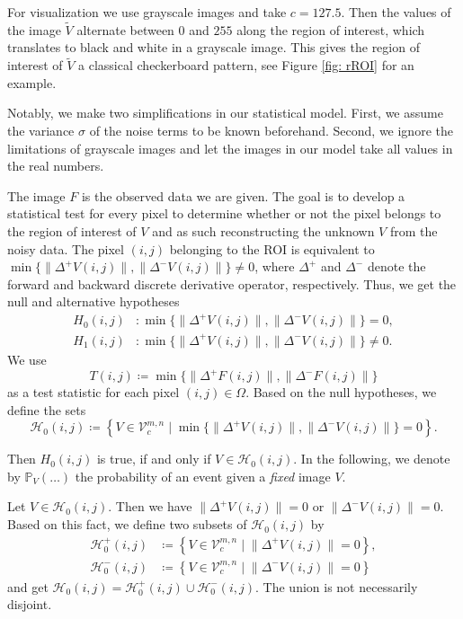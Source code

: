 \documentclass[a4paper,12pt]{article}
\newcommand{\norm}[1]{\lVert#1\rVert}
\theoremstyle{plain}
\theoremstyle{definition}
\begin{document}
For visualization we use grayscale images and take $c = 127.5$. Then the values of the image $\tilde{V}$ alternate between $0$ and $255$ along the region of interest, which translates to black and white in a grayscale image. This gives the region of interest of $\tilde{V}$ a classical checkerboard pattern, see Figure \ref{fig: rROI} for an example.

Notably, we make two simplifications in our statistical model. First, we assume the variance $\sigma$ of the noise terms to be known beforehand. Second, we ignore the limitations of grayscale images and let the images in our model take all values in the real numbers.

The image $F$ is the observed data we are given. The goal is to develop a statistical test for every pixel to determine whether or not the pixel belongs to the region of interest of $V$ and as such reconstructing the unknown $V$ from the noisy data. The pixel $(i, j)$ belonging to the ROI is equivalent to $\min \{ \norm{\Delta^+ V(i, j)}, \norm{\Delta^- V(i, j)} \} \neq 0$, where $\Delta^+$ and $\Delta^-$ denote the forward and backward discrete derivative operator, respectively. Thus, we get the null and alternative hypotheses
\begin{align*}
	H_0(i, j)&: \min \{ \norm{\Delta^+ V(i, j)}, \norm{\Delta^- V(i, j)} \} = 0, \\
	H_1(i, j)&: \min \{ \norm{\Delta^+ V(i, j)}, \norm{\Delta^- V(i, j)} \} \neq 0.
\end{align*}
We use
\begin{equation*}
	T(i, j) \coloneqq \min \{ \norm{\Delta^+ F(i, j)}, \norm{\Delta^- F(i, j)} \}
\end{equation*}
as a test statistic for each pixel $(i, j) \in \Omega$. Based on the null hypotheses, we define the sets
\begin{equation*}
	\mathcal{H}_0(i, j) \coloneqq \left\{ V \in \mathcal{V}_c^{m, n} \mid \min \{ \norm{\Delta^+ V(i, j)}, \norm{\Delta^- V(i, j)} \} = 0 \right\}.
\end{equation*}

Then $H_0(i, j)$ is true, if and only if $V \in \mathcal{H}_0(i, j)$. In the following, we denote by $\mathbb{P}_V( \ldots )$ the probability of an event given a \emph{fixed} image $V$.

Let $V \in \mathcal{H}_0(i, j)$. Then we have $\norm{\Delta^+ V(i, j)} = 0$ or $\norm{\Delta^- V(i, j)} = 0$. Based on this fact, we define two subsets of $\mathcal{H}_0(i, j)$ by
\begin{align*}
	\mathcal{H}_0^+(i, j) &\coloneqq \left\{ V \in \mathcal{V}_c^{m, n} \mid \norm{\Delta^+ V(i, j)} = 0 \right\}, \\
	\mathcal{H}_0^-(i, j) &\coloneqq \left\{ V \in \mathcal{V}_c^{m, n} \mid \norm{\Delta^- V(i, j)} = 0 \right\}
\end{align*}
and get $\mathcal{H}_0(i, j) = \mathcal{H}_0^+(i, j) \cup \mathcal{H}_0^-(i, j)$. The union is not necessarily disjoint.
\end{document}
